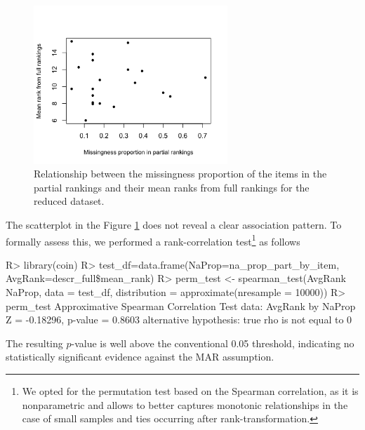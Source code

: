 \begin{figure}[t]
     \centering
     \includegraphics[width=0.65\textwidth]{figures/RJ2025_paper_scatter_beers.png}
      \caption{Relationship between the missingness proportion of the items in the partial rankings and their mean ranks from full rankings for the reduced  dataset.}
     \label{fig:scat_beers}
\end{figure}
%
The scatterplot in the Figure \ref{fig:scat_beers} does not reveal a clear association pattern. To formally assess this, we performed a rank-correlation test\footnote{We opted for the permutation test based on the Spearman correlation, as it is nonparametric and allows to better captures monotonic relationships in the case of small samples and ties occurring after rank-transformation.
} as follows
\begin{example*}
R> library(coin)
R> test\_df=data.frame(NaProp=na\_prop\_part\_by\_item, AvgRank=descr\_full\$mean\_rank)
R> perm\_test <- spearman\_test(AvgRank ~ NaProp, data = test\_df, 
                             distribution = approximate(nresample = 10000))
R> perm\_test
	Approximative Spearman Correlation Test
data:  AvgRank by NaProp
Z = -0.18296, p-value = 0.8603
alternative hypothesis: true rho is not equal to 0
\end{example*}
The resulting $p$-value is well above the conventional 0.05 threshold, indicating no statistically significant evidence against
the MAR assumption.




\address{Marta Crispino\\
  Department of Economics, Statistics and Research\\
  Bank of Italy, Rome, Italy\\
  }
  
\address{Cristina Mollica\\
 Department of Statistical Sciences\\
 Sapienza University of Rome, Italy\\
  }

\address{Lucia  Modugno\\
 Department of Economics, Statistics and Research\\
  Bank of Italy, Rome, Italy\\
  }
